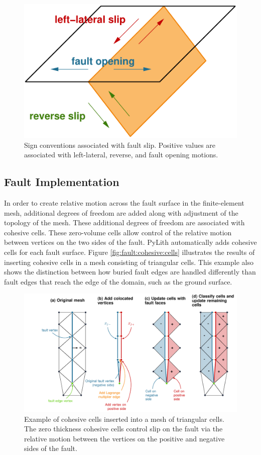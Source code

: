\begin{figure}[htbp]
  \includegraphics{physics/figs/slipmotions}
  \caption{Sign conventions associated with fault slip. Positive values are associated
    with left-lateral, reverse, and fault opening motions.}
  \label{fig:fault:slip:motions} 
\end{figure}

\subsection{Fault Implementation}

In order to create relative motion across the fault surface in the
finite-element mesh, additional degrees of freedom are added along
with adjustment of the topology of the mesh. These additional degrees
of freedom are associated with cohesive cells. These zero-volume cells
allow control of the relative motion between vertices on the two sides
of the fault. PyLith automatically adds cohesive cells for each fault
surface. Figure \vref{fig:fault:cohesive:cells} illustrates the results
of inserting cohesive cells in a mesh consisting of triangular cells.
This example also shows the distinction between how buried fault edges
are handled differently than fault edges that reach the edge of the
domain, such as the ground surface.

\begin{figure}[htbp]
  \includegraphics[width=6.25in]{physics/figs/cohesivecell}
  \caption{Example of cohesive cells inserted into a mesh of
    triangular cells.  The zero thickness cohesive cells control slip
    on the fault via the relative motion between the vertices on the
    positive and negative sides of the fault.}
  \label{fig:fault:cohesive:cells} 
\end{figure}

